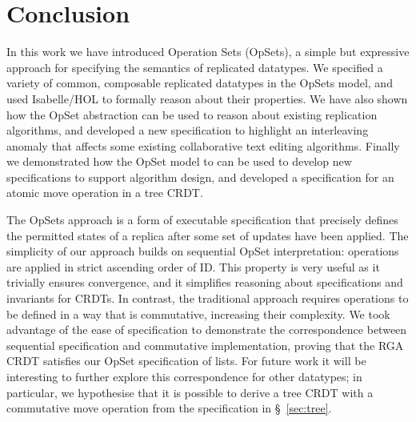 \documentclass[a4paper,english]{lipics-v2018}
\begin{document}






\section{Conclusion}

In this work we have introduced Operation Sets (OpSets), a simple but expressive approach for specifying the semantics of replicated datatypes.
We specified a variety of common, composable replicated datatypes in the OpSets model, and used Isabelle/HOL to formally reason about their properties.
We have also shown how the OpSet abstraction can be used to reason about existing replication algorithms, and developed a new specification to highlight an interleaving anomaly that affects some existing collaborative text editing algorithms.
Finally we demonstrated how the OpSet model to can be used to develop new specifications to support algorithm design, and developed a specification for an atomic move operation in a tree CRDT.

The OpSets approach is a form of executable specification that precisely defines the permitted states of a replica after some set of updates have been applied.
The simplicity of our approach builds on sequential OpSet interpretation: operations are applied in strict ascending order of ID.
This property is very useful as it trivially ensures convergence, and it simplifies reasoning about specifications and invariants for CRDTs.
In contrast, the traditional approach requires operations to be defined in a way that is commutative, increasing their complexity.
We took advantage of the ease of specification to demonstrate the correspondence between sequential specification and commutative implementation, proving that the RGA CRDT satisfies our OpSet specification of lists.
For future work it will be interesting to further explore this correspondence for other datatypes; in particular, we hypothesise that it is possible to derive a tree CRDT with a commutative move operation from the specification in \S~\ref{sec:tree}.

\end{document}
